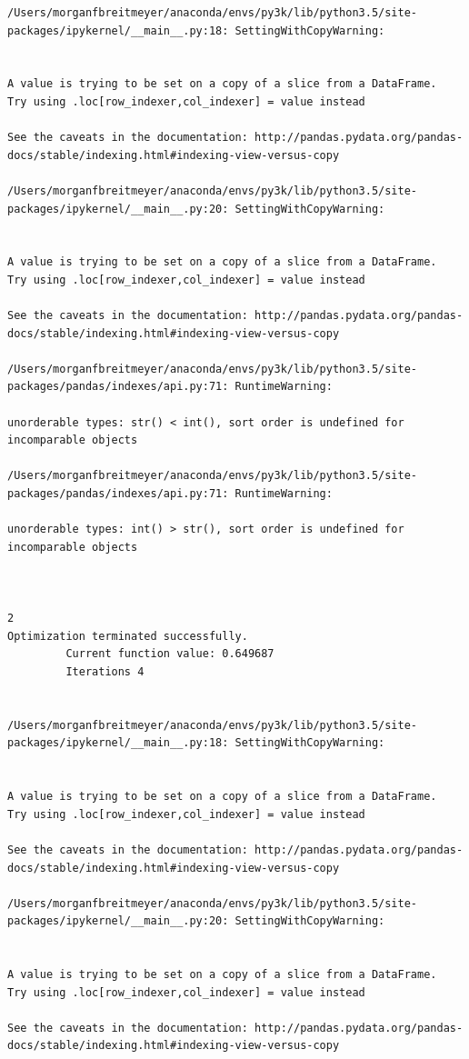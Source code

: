 \begin{lstlisting}
/Users/morganfbreitmeyer/anaconda/envs/py3k/lib/python3.5/site-packages/ipykernel/__main__.py:18: SettingWithCopyWarning:


A value is trying to be set on a copy of a slice from a DataFrame.
Try using .loc[row_indexer,col_indexer] = value instead

See the caveats in the documentation: http://pandas.pydata.org/pandas-docs/stable/indexing.html#indexing-view-versus-copy

/Users/morganfbreitmeyer/anaconda/envs/py3k/lib/python3.5/site-packages/ipykernel/__main__.py:20: SettingWithCopyWarning:


A value is trying to be set on a copy of a slice from a DataFrame.
Try using .loc[row_indexer,col_indexer] = value instead

See the caveats in the documentation: http://pandas.pydata.org/pandas-docs/stable/indexing.html#indexing-view-versus-copy

/Users/morganfbreitmeyer/anaconda/envs/py3k/lib/python3.5/site-packages/pandas/indexes/api.py:71: RuntimeWarning:

unorderable types: str() < int(), sort order is undefined for incomparable objects

/Users/morganfbreitmeyer/anaconda/envs/py3k/lib/python3.5/site-packages/pandas/indexes/api.py:71: RuntimeWarning:

unorderable types: int() > str(), sort order is undefined for incomparable objects



2
Optimization terminated successfully.
         Current function value: 0.649687
         Iterations 4


/Users/morganfbreitmeyer/anaconda/envs/py3k/lib/python3.5/site-packages/ipykernel/__main__.py:18: SettingWithCopyWarning:


A value is trying to be set on a copy of a slice from a DataFrame.
Try using .loc[row_indexer,col_indexer] = value instead

See the caveats in the documentation: http://pandas.pydata.org/pandas-docs/stable/indexing.html#indexing-view-versus-copy

/Users/morganfbreitmeyer/anaconda/envs/py3k/lib/python3.5/site-packages/ipykernel/__main__.py:20: SettingWithCopyWarning:


A value is trying to be set on a copy of a slice from a DataFrame.
Try using .loc[row_indexer,col_indexer] = value instead

See the caveats in the documentation: http://pandas.pydata.org/pandas-docs/stable/indexing.html#indexing-view-versus-copy


\end{lstlisting}
